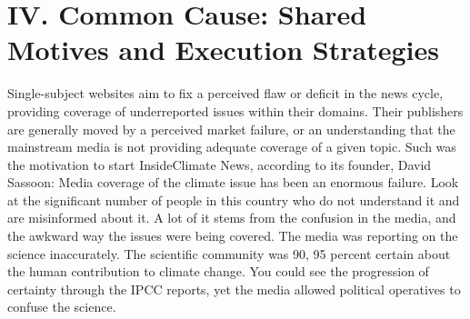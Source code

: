 \chapter{IV. Common Cause: Shared Motives and Execution Strategies}
Single-subject websites aim to fix a perceived flaw or deficit in the news
cycle, providing coverage of underreported issues within their domains.
Their publishers are generally moved by a perceived market failure, or an
understanding that the mainstream media is not providing adequate coverage
of a given topic.
Such was the motivation to start InsideClimate News, according to its
founder, David Sassoon:
Media coverage of the climate issue has been an enormous failure.
Look at the significant number of people in this country who do not
understand it and are misinformed about it.
A lot of it stems from the confusion in the media, and the awkward
way the issues were being covered. The media was reporting on the
science inaccurately. The scientific community was 90, 95 percent
certain about the human contribution to climate change. You could
see the progression of certainty through the IPCC reports, yet the
media allowed political operatives to confuse the science.


